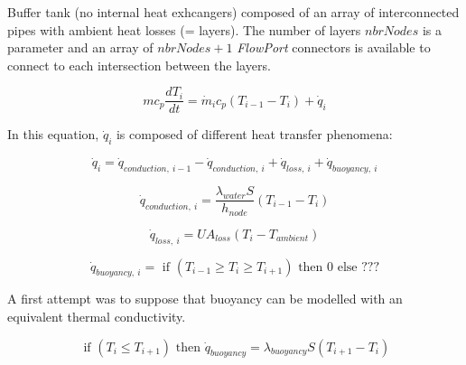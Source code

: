 Buffer tank (no internal heat exhcangers) composed of an array of interconnected pipes with ambient heat losses (= layers).  The number of layers $nbrNodes$ is a parameter and an array of $nbrNodes + 1$ \emph{FlowPort} connectors is available to connect to each intersection between the layers. 

\begin{equation}
mc_p \frac{dT_i}{dt}=\dot{m}_ic_p(T_{i-1} - T_i) + \dot{q}_i
\label{eq:}
\end{equation}

In this equation, $\dot{q}_i$ is composed of different heat transfer phenomena:

\begin{equation}
\dot{q}_i = \dot{q}_{conduction,~i-1} - \dot{q}_{conduction,~i} + \dot{q}_{loss,~i} +  \dot{q}_{buoyancy,~i}
\label{eq:}
\end{equation}

\begin{equation}
\dot{q}_{conduction,~i} = \frac{\lambda_{water} S}{h_{node}} (T_{i-1} - T_i) 
\label{eq:}
\end{equation}

\begin{equation}
\dot{q}_{loss,~i} = UA_{loss}(T_{i} - T_{ambient}) 
\label{eq:}
\end{equation}

\begin{equation}
\dot{q}_{buoyancy,~i} = \text{ if } (T_{i-1} \geq T_i \geq T_{i+1}) \text{ then } 0 \text{ else } ???
\label{eq:}
\end{equation}

A first attempt was to suppose that buoyancy can be modelled with an equivalent thermal conductivity. 

\begin{equation}
\text{ if } (T_{i} \leq T_{i+1}) \text{ then } \dot{q}_{buoyancy} = \lambda_{buoyancy} S (T_{i+1}-T_i)
\label{eq:}
\end{equation}

